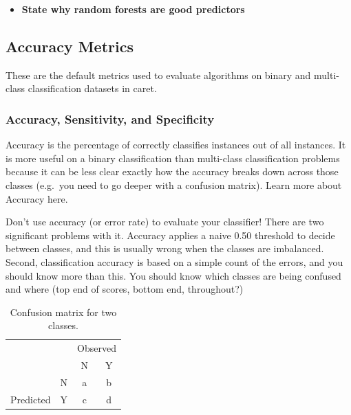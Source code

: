 \documentclass[12pt,]{article}
\providecommand{\tightlist}{%
  \setlength{\itemsep}{0pt}\setlength{\parskip}{0pt}}
\begin{document}
\begin{itemize}
\tightlist
\item
  \textbf{State why random forests are good predictors}
\end{itemize}

\subsection{Accuracy Metrics}\label{accuracy-metrics}

These are the default metrics used to evaluate algorithms on binary and
multi-class classification datasets in caret.

\subsubsection{Accuracy, Sensitivity, and
Specificity}\label{accuracy-sensitivity-and-specificity}

Accuracy is the percentage of correctly classifies instances out of all
instances. It is more useful on a binary classification than multi-class
classification problems because it can be less clear exactly how the
accuracy breaks down across those classes (e.g.~you need to go deeper
with a confusion matrix). Learn more about Accuracy here.

Don't use accuracy (or error rate) to evaluate your classifier! There
are two significant problems with it. Accuracy applies a naive 0.50
threshold to decide between classes, and this is usually wrong when the
classes are imbalanced. Second, classification accuracy is based on a
simple count of the errors, and you should know more than this. You
should know which classes are being confused and where (top end of
scores, bottom end, throughout?)

\begin{table}[!h]

\caption{\label{tab:unnamed-chunk-2}\label{tab:confusion-matrix} Confusion matrix for two classes.}
\centering
\fontsize{12}{14}\selectfont
\begin{tabular}{lc|cc}
\toprule
\multicolumn{2}{c}{ } & \multicolumn{2}{c}{Observed} \\
\cmidrule(l{3pt}r{3pt}){3-4}
  &   & N & Y\\
\midrule
\rowcolor{gray!6}   & N & a & b\\

\multirow{-2}{*}{\raggedright\arraybackslash Predicted} & Y & c & d\\
\bottomrule
\end{tabular}
\end{table}
\end{document}
